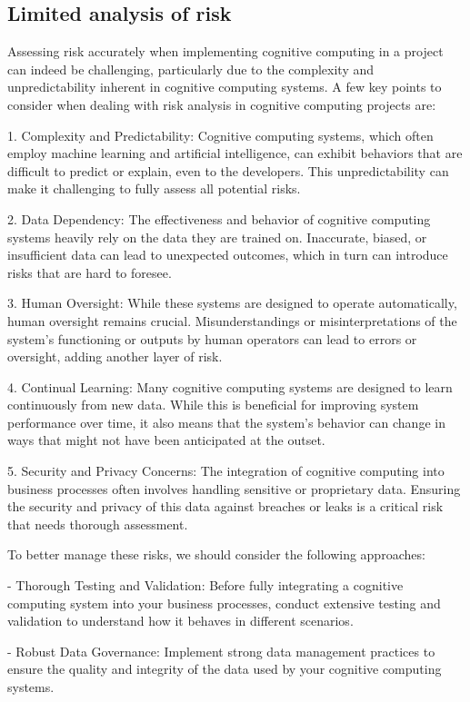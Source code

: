 \documentclass{article}
\begin{document}
\subsection{Limited analysis of risk}
Assessing risk accurately when implementing cognitive computing in a project can indeed be challenging, particularly due to the complexity and unpredictability inherent in cognitive computing systems. A few key points to consider when dealing with risk analysis in cognitive computing projects are:

1. Complexity and Predictability: Cognitive computing systems, which often employ machine learning and artificial intelligence, can exhibit behaviors that are difficult to predict or explain, even to the developers. This unpredictability can make it challenging to fully assess all potential risks.

2. Data Dependency: The effectiveness and behavior of cognitive computing systems heavily rely on the data they are trained on. Inaccurate, biased, or insufficient data can lead to unexpected outcomes, which in turn can introduce risks that are hard to foresee.

3. Human Oversight: While these systems are designed to operate automatically, human oversight remains crucial. Misunderstandings or misinterpretations of the system's functioning or outputs by human operators can lead to errors or oversight, adding another layer of risk.

4. Continual Learning: Many cognitive computing systems are designed to learn continuously from new data. While this is beneficial for improving system performance over time, it also means that the system's behavior can change in ways that might not have been anticipated at the outset.

5. Security and Privacy Concerns: The integration of cognitive computing into business processes often involves handling sensitive or proprietary data. Ensuring the security and privacy of this data against breaches or leaks is a critical risk that needs thorough assessment.

To better manage these risks, we should consider the following approaches:

- Thorough Testing and Validation: Before fully integrating a cognitive computing system into your business processes, conduct extensive testing and validation to understand how it behaves in different scenarios.
  
  - Robust Data Governance: Implement strong data management practices to ensure the quality and integrity of the data used by your cognitive computing systems.
\end{document}
